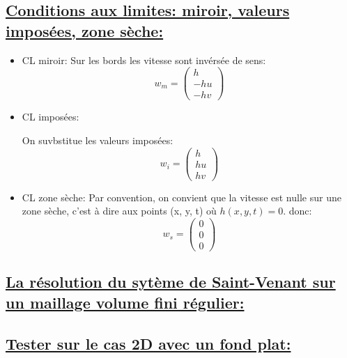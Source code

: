 \subsection[Conditions aux limites: miroir, valeurs impos\'ees, zone s\`eche]{\uline{Conditions aux limites: miroir, valeurs impos\'ees, zone s\`eche:}}

\begin{itemize}
\item CL miroir:
Sur les bords les vitesse sont inv\'ers\'ee de sens:
$$w_m = \begin{pmatrix}
h\\
-hu \\
-hv
\end{pmatrix}
$$


\item CL impos\'ees:

On suvbstitue les valeurs impos\'ees:
$$w_i = \begin{pmatrix}
h\\
hu \\
hv
\end{pmatrix}$$

\item CL zone s\`eche:
Par convention, on convient que la vitesse est nulle sur une zone s\`eche, c’est \`a dire aux points (x, y, t) o\`u $h(x, y, t) = 0$.
donc:
$$w_s = \begin{pmatrix}
0\\
0 \\
0
\end{pmatrix}$$
\end{itemize}
\subsection[La r\'esolution du syt\`eme de Saint-Venant sur un maillage volume fini r\'egulier]{\uline{La r\'esolution du syt\`eme de Saint-Venant sur un maillage volume fini r\'egulier:}}



\subsection[Tester sur le cas 2D avec un fond plat]{\uline{Tester sur le cas 2D avec un fond plat:}}

